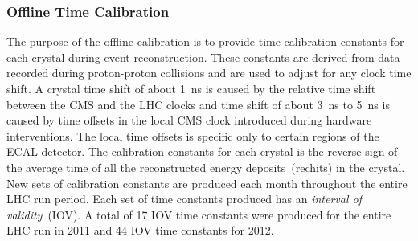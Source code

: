 \subsubsection{Offline Time Calibration}
The purpose of the offline calibration is to provide time calibration constants for each crystal during event reconstruction. These constants are derived from data recorded during  proton-proton collisions and are used to adjust for any clock time shift. A crystal time shift of about 1~ns is caused by the relative time shift between the CMS and the LHC clocks and time shift of about 3~ns to 5~ns is caused by time offsets in the local CMS clock introduced during hardware interventions. The local time offsets is specific only to certain regions of the ECAL detector.
The calibration constants for each crystal is the reverse sign of the average time of all the reconstructed energy deposits~(rechits) in the crystal.
New sets of calibration constants are produced each month throughout the entire LHC run period.
Each set of time constants produced has an \textit{interval of validity}~(IOV).
A total of 17 IOV time constants were produced for the entire LHC run in 2011 and 44 IOV time constants for 2012.
